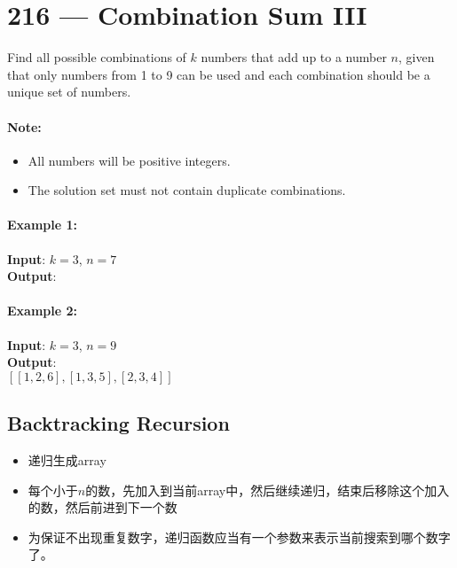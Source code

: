 \section{216 --- Combination Sum III}
Find all possible combinations of $k$ numbers that add up to a number $n$, given that only numbers from 1 to 9 can be used and each combination should be a unique set of numbers.
\paragraph{Note:}
\begin{itemize}
\item All numbers will be positive integers.
\item The solution set must not contain duplicate combinations.
\end{itemize}
\paragraph{Example 1:}
\begin{flushleft}
\textbf{Input}: $k = 3$, $n = 7$
\\
\textbf{Output}: 
\\
\fcj{[[1,2,4]]}
\end{flushleft}
\paragraph{Example 2:}
\begin{flushleft}
\textbf{Input}: $k = 3$, $n = 9$
\\
\textbf{Output}: 
\\
$[[1,2,6], [1,3,5], [2,3,4]]$
\end{flushleft}
\subsection{Backtracking Recursion}
\begin{itemize}
\item 递归生成array
\item 每个小于$n$的数，先加入到当前array中，然后继续递归，结束后移除这个加入的数，然后前进到下一个数
\item 为保证不出现重复数字，递归函数应当有一个参数来表示当前搜索到哪个数字了。
\end{itemize}

